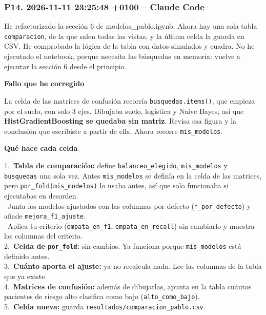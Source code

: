 \documentclass[11pt,a4paper]{article}
\begin{document}
\subsubsection*{P14. 2026-11-11 23:25:48 +0100 -- Claude Code}
{\small
He refactorizado la sección 6 de modelos\_\allowbreak{}pablo.ipynb. Ahora hay una sola tabla \texttt{comparacion}, de la que salen todas las vistas, y la última celda la guarda en CSV. He comprobado la lógica de la tabla con datos simulados y cuadra. No he ejecutado el notebook, porque necesita las búsquedas en memoria: vuelve a ejecutar la sección 6 desde el principio.

\smallskip\noindent\textbf{Fallo que he corregido}\par
La celda de las matrices de confusión recorría \texttt{busquedas.items()}, que empieza por el suelo, con solo 3 ejes. Dibujaba suelo, logística y Naive Bayes, así que \textbf{HistGradientBoosting se quedaba sin matriz}. Revisa esa figura y la conclusión que escribiste a partir de ella. Ahora recorre \texttt{mis\_\allowbreak{}modelos}.

\smallskip\noindent\textbf{Qué hace cada celda}\par
\hspace*{1.0em}1.~\textbf{Tabla de comparación:} define \texttt{balanceo\_\allowbreak{}elegido}, \texttt{mis\_\allowbreak{}modelos} y \texttt{busquedas} una sola vez. Antes \texttt{mis\_\allowbreak{}modelos} se definía en la celda de las matrices, pero \texttt{por\_\allowbreak{}fold(mis\_\allowbreak{}modelos)} lo usaba antes, así que solo funcionaba si ejecutabas en desorden. \\{}
\hspace*{2.5em}\textbullet~Junta los modelos ajustados con las columnas por defecto (\texttt{*\_\allowbreak{}por\_\allowbreak{}defecto}) y añade \texttt{mejora\_\allowbreak{}f1\_\allowbreak{}ajuste}. \\{}
\hspace*{2.5em}\textbullet~Aplica tu criterio (\texttt{empata\_\allowbreak{}en\_\allowbreak{}f1}, \texttt{empata\_\allowbreak{}en\_\allowbreak{}recall}) sin cambiarlo y muestra las columnas del criterio. \\{}
\hspace*{1.0em}2.~\textbf{Celda de \texttt{por\_\allowbreak{}fold}:} sin cambios. Ya funciona porque \texttt{mis\_\allowbreak{}modelos} está definido antes. \\{}
\hspace*{1.0em}3.~\textbf{Cuánto aporta el ajuste:} ya no recalcula nada. Lee las columnas de la tabla que ya existe. \\{}
\hspace*{1.0em}4.~\textbf{Matrices de confusión:} además de dibujarlas, apunta en la tabla cuántos pacientes de riesgo alto clasifica como bajo (\texttt{alto\_\allowbreak{}como\_\allowbreak{}bajo}). \\{}
\hspace*{1.0em}5.~\textbf{Celda nueva:} guarda \texttt{resultados/\allowbreak{}comparacion\_\allowbreak{}pablo.csv}.

}
\end{document}
